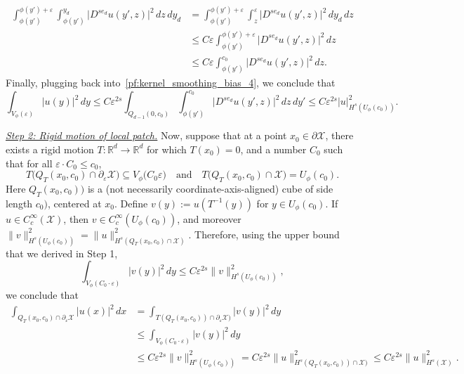 \documentclass{article}
\newcommand{\Reals}{\mathbb{R}}
\newcommand{\1}{\mathbf{1}}
\newcommand{\Rd}{\Reals^d}
\newcommand{\mc}[1]{\mathcal{#1}}
\theoremstyle{definition}
\theoremstyle{remark}
\begin{document}
\begin{align*}
\int_{\phi(y')}^{\phi(y') + \varepsilon} \int_{\phi(y')}^{y_d} \bigl|D^{se_d}u(y',z)\bigr|^2 \,dz \,dy_d & = \int_{\phi(y')}^{\phi(y') + \varepsilon} \int_{z}^{\varepsilon} \bigl|D^{se_d}u(y',z)\bigr|^2 \,dy_d \,dz \\
& \leq C \varepsilon \int_{\phi(y')}^{\phi(y') + \varepsilon} \bigl|D^{se_d}u(y',z)\bigr|^2 \,dz \\
& \leq C \varepsilon \int_{\phi(y')}^{c_0} \bigl|D^{se_d}u(y',z)\bigr|^2 \,dz.
\end{align*}
Finally, plugging back into~\eqref{pf:kernel_smoothing_bias_4}, we conclude that
\begin{equation*}
\int_{V_{\phi}(\varepsilon)} |u(y)|^2 \,dy \leq C \varepsilon^{2s} \int_{Q_{d - 1}(0,c_0)} \int_{\phi(y')}^{c_0} \bigl|D^{se_d}u(y',z)\bigr|^2 \,dz \,dy' \leq C \varepsilon^{2s} |u|_{H^s(U_{\phi}(c_0))}^2.
\end{equation*}

\underline{\textit{Step 2: Rigid motion of local patch.}} Now, suppose that at a point $x_0 \in \partial \mc{X}$, there exists a rigid motion $T: \Rd \to \Rd$ for which $T(x_0) = 0$, and a number $C_0$ such that for all $\varepsilon \cdot C_0 \leq c_0$, 
\begin{equation*}
T\bigl(Q_{T}(x_0,c_0) \cap \partial_{\varepsilon}\mc{X}\bigr) \subseteq V_{\phi}\bigl(C_0\varepsilon\bigr) \quad\textrm{and}\quad T\bigl(Q_T(x_0,c_0) \cap \mc{X}\bigr) = U_{\phi}(c_0).
\end{equation*}
Here $Q_{T}(x_0,c_0))$ is a (not necessarily coordinate-axis-aligned) cube of side length $c_0)$, centered at $x_0$. Define $v(y) := u(T^{-1}(y))$ for $y \in U_{\phi}(c_0)$. If $u \in C_c^{\infty}(\mc{X})$, then $v \in C_c^{\infty}(U_{\phi}(c_0))$, and moreover $\|v\|_{H^s(U_{\phi}(c_0))}^2 = \|u\|_{H^s(Q_{T}(x_0,c_0) \cap \mc{X})}^2$. Therefore, using the upper bound that we derived in Step 1,
\begin{equation*}
\int_{V_{\phi}(C_0 \cdot \varepsilon)} |v(y)|^2 \,dy \leq C \varepsilon^{2s} \|v\|_{H^s(U_{\phi}(c_0))}^2,
\end{equation*}
we conclude that
\begin{align*}
\int_{Q_{T}(x_0,c_0) \cap \partial_{\varepsilon}\mc{X}} |u(x)|^2 \,dx & = \int_{T(Q_T(x_0,c_0)) \cap \partial_{\varepsilon}\mc{X})} |v(y)|^2 \,dy \\
& \leq \int_{V_{\phi}(C_0 \cdot \varepsilon)} |v(y)|^2 \,dy \\
& \leq C \varepsilon^{2s} \|v\|_{H^s(U_{\phi}(c_0))}^2 = C \varepsilon^{2s} \|u\|_{H^s(Q_{T}(x_0,c_0)) \cap \mc{X})}^2 \leq C \varepsilon^{2s} \|u\|_{H^s(\mc{X})}^2.
\end{align*}
\end{document}
